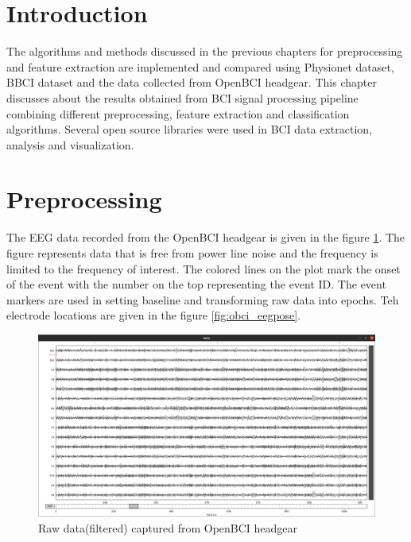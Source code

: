 \section*{Introduction}
 The algorithms and methods discussed in the previous chapters for preprocessing and feature extraction are implemented and compared using Physionet dataset, BBCI dataset and the data collected from OpenBCI headgear. This chapter discusses about the results obtained from BCI signal processing pipeline combining different preprocessing, feature extraction and classification algorithms. Several open source libraries were used in BCI data extraction, analysis and visualization.

\section{Preprocessing}
 The EEG data recorded from the OpenBCI headgear is given in the figure \ref{fig:obci_rawfltrd}. The figure represents data that is free from power line noise and the frequency is limited to the frequency of interest. The colored lines on the plot mark the onset of the event with the number on the top representing the event ID. The event markers are used in setting baseline and transforming raw data into epochs. Teh electrode locations are given in the figure \ref{fig:obci_eegpose}.

 \begin{figure}[h]
    \begin{center} 
    \includegraphics[height=0.6\textwidth]{images/obci_rawfltrd.png}
    \caption{Raw data(filtered) captured from OpenBCI headgear}
    \label{fig:obci_rawfltrd}
\end{center}
\end{figure}

